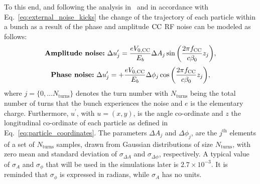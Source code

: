 To this end, and following the analysis in~\cite{PhysRevSTAB.18.101001} and in accordance with Eq.~\eqref{eq:external_noise_kicks} the change of the trajectory of each particle within a bunch as a result of the phase and amplitude ${\mathrm{CC}}$ RF noise can be modeled as follows:
\begin{equation}\label{eq:amplitude_noise_kick}
    \textbf{\textrm{Amplitude noise:}} \ \Delta u^\prime_{j} =  \frac{e {V_\mathrm{0, CC}}}{E_b} \Delta A_j \sin{\left (  \frac{2 \pi {f_\mathrm{CC}}}{c \beta_0}z_j   \right )},
  \end{equation}
  \begin{equation}\label{eq:phase_noise_kick}
      \textbf{\textrm{Phase noise:}} \ \Delta u^\prime_{j} = +  \frac{e {V_\mathrm{0, CC}}}{E_b} \Delta \phi_j  \cos{\left (  \frac{2 \pi {f_\mathrm{CC}}}{c \beta_0}z_j   \right )},
  \end{equation}
where $j=\{ 0,\dots N_\mathrm{turns} \}$ denotes the turn number with $N_\mathrm{turns}$ being the total number of turns that the bunch experiences the noise and $e$ is the elementary charge. Furthermore, $u^\prime$, with $u=(x,y)$, is the angle co-ordinate and $z$ the longitudinal co-ordinate of each particle as defined in Eq.~\eqref{eq:particle_coordinates}. The parameters $\Delta A_j$ and $\Delta \phi_j$, are the $j^\textrm{th}$ elements of a set of $N_\mathrm{turns}$ samples, drawn from Gaussian distributions of size $N_\mathrm{turns}$, with zero mean and standard deviation of $\sigma_{\Delta A}$ and $\sigma_{\Delta \phi}$, respectively. A typical value of $\sigma_A$ and $\sigma_\phi$ that will be used in the simulations later is $2.7 \times 10^{-3}$.  It is reminded that $\sigma_\phi$ is expressed in radians, while $\sigma_A$ has no units.

